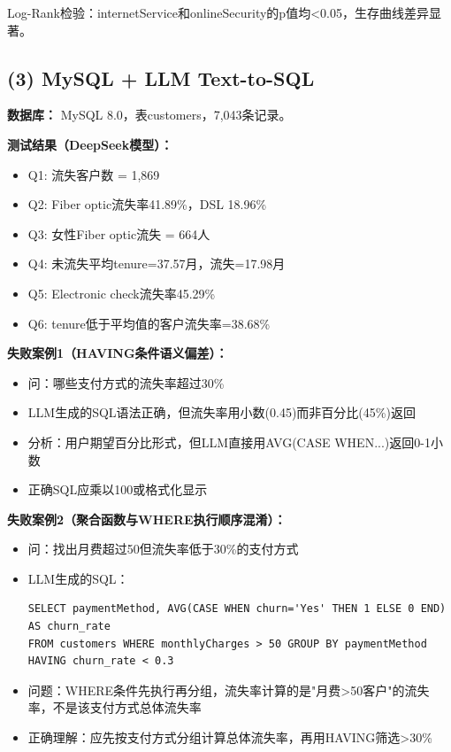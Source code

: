 \documentclass[12pt,a4paper]{article}
\begin{document}
Log-Rank检验：internetService和onlineSecurity的p值均<0.05，生存曲线差异显著。

\subsection{(3) MySQL + LLM Text-to-SQL}

\textbf{数据库：} MySQL 8.0，表customers，7,043条记录。

\textbf{测试结果（DeepSeek模型）：}
\begin{itemize}
    \item Q1: 流失客户数 = 1,869
    \item Q2: Fiber optic流失率41.89\%，DSL 18.96\%
    \item Q3: 女性Fiber optic流失 = 664人
    \item Q4: 未流失平均tenure=37.57月，流失=17.98月
    \item Q5: Electronic check流失率45.29\%
    \item Q6: tenure低于平均值的客户流失率=38.68\%
\end{itemize}

\textbf{失败案例1（HAVING条件语义偏差）：}
\begin{itemize}
    \item 问：哪些支付方式的流失率超过30\%
    \item LLM生成的SQL语法正确，但流失率用小数(0.45)而非百分比(45\%)返回
    \item 分析：用户期望百分比形式，但LLM直接用AVG(CASE WHEN...)返回0-1小数
    \item 正确SQL应乘以100或格式化显示
\end{itemize}

\textbf{失败案例2（聚合函数与WHERE执行顺序混淆）：}
\begin{itemize}
    \item 问：找出月费超过50但流失率低于30\%的支付方式
    \item LLM生成的SQL：
    \begin{verbatim}
SELECT paymentMethod, AVG(CASE WHEN churn='Yes' THEN 1 ELSE 0 END) AS churn_rate
FROM customers WHERE monthlyCharges > 50 GROUP BY paymentMethod HAVING churn_rate < 0.3
    \end{verbatim}
    \item 问题：WHERE条件先执行再分组，流失率计算的是"月费>50客户"的流失率，不是该支付方式总体流失率
    \item 正确理解：应先按支付方式分组计算总体流失率，再用HAVING筛选>30\%
\end{itemize}
\end{document}
